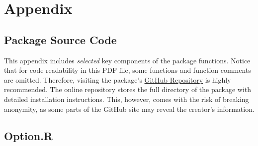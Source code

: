 \appendix

\chapter{Appendix}

\section{Package Source Code} \label{apd:source_code}

This appendix includes \textit{selected} key components of the package functions. Notice that for code readability in this PDF file, some functions and function comments are omitted. Therefore, visiting the package's \hyperref{https://github.com/ZhaiJason/rmcop}{site}{rmcop Repository}{GitHub Repository} is highly recommended. The online repository stores the full directory of the package with detailed installation instructions. This, however, comes with the risk of breaking anonymity, as some parts of the GitHub site may reveal the creator's information.

\newpage

\section{Option.R}

